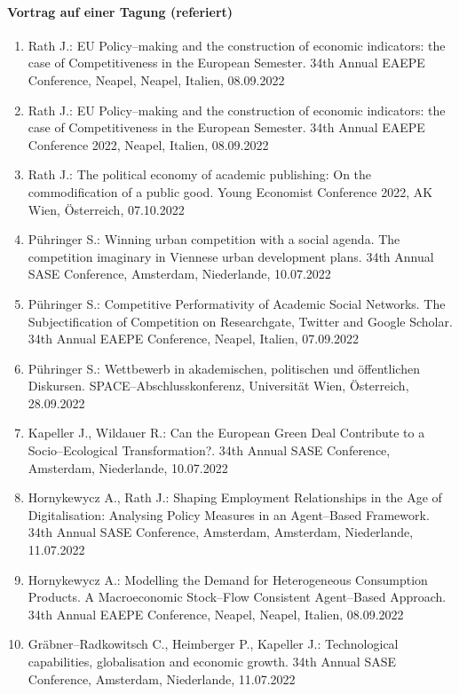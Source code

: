 \paragraph{Vortrag auf einer Tagung (referiert)}
\begin{enumerate}
	\item Rath J.: EU Policy--making and the construction of economic indicators: the case of Competitiveness in the European Semester. 34th Annual EAEPE Conference, Neapel, Neapel, Italien, 08.09.2022
	\item Rath J.: EU Policy--making and the construction of economic indicators: the case of Competitiveness in the European Semester. 34th Annual EAEPE Conference 2022, Neapel, Italien, 08.09.2022
	\item Rath J.: The political economy of academic publishing: On the commodification of a public good. Young Economist Conference 2022, AK Wien, Österreich, 07.10.2022
	\item Pühringer S.: Winning urban competition with a social agenda. The competition imaginary in Viennese urban development plans. 34th Annual SASE Conference, Amsterdam, Niederlande, 10.07.2022
	\item Pühringer S.: Competitive Performativity of Academic Social Networks. The Subjectification of Competition on Researchgate, Twitter and Google Scholar. 34th Annual EAEPE Conference, Neapel, Italien, 07.09.2022
	\item Pühringer S.: Wettbewerb in akademischen, politischen und öffentlichen Diskursen. SPACE--Abschlusskonferenz,  Universität Wien, Österreich, 28.09.2022
	\item Kapeller J., Wildauer R.: Can the European Green Deal Contribute to a Socio--Ecological Transformation?. 34th Annual SASE Conference, Amsterdam, Niederlande, 10.07.2022
	\item Hornykewycz A., Rath J.: Shaping Employment Relationships in the Age of Digitalisation: Analysing Policy Measures in an Agent--Based Framework. 34th Annual SASE Conference, Amsterdam, Amsterdam, Niederlande, 11.07.2022
	\item Hornykewycz A.: Modelling the Demand for Heterogeneous Consumption Products. A Macroeconomic Stock--Flow Consistent Agent--Based Approach. 34th Annual EAEPE Conference, Neapel, Neapel, Italien, 08.09.2022
	\item Gräbner--Radkowitsch C., Heimberger P., Kapeller J.: Technological capabilities, globalisation and economic growth. 34th Annual SASE Conference, Amsterdam, Niederlande, 11.07.2022

\end{enumerate}
